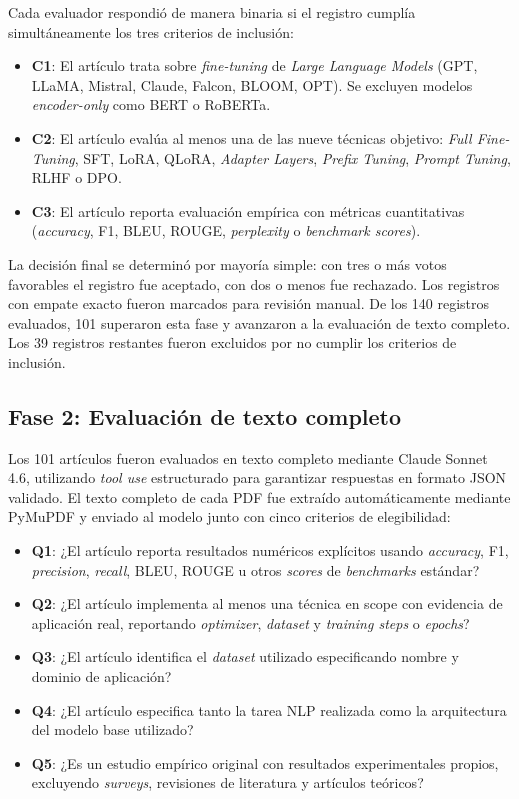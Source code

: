 Cada evaluador respondió de manera binaria si el registro cumplía simultáneamente los tres criterios de inclusión:

\begin{itemize}
    \item \textbf{C1}: El artículo trata sobre \textit{fine-tuning} de \textit{Large Language Models} (GPT, LLaMA, Mistral, Claude, Falcon, BLOOM, OPT). Se excluyen modelos \textit{encoder-only} como BERT o RoBERTa.
    \item \textbf{C2}: El artículo evalúa al menos una de las nueve técnicas objetivo: \textit{Full Fine-Tuning}, SFT, LoRA, QLoRA, \textit{Adapter Layers}, \textit{Prefix Tuning}, \textit{Prompt Tuning}, RLHF o DPO.
    \item \textbf{C3}: El artículo reporta evaluación empírica con métricas cuantitativas (\textit{accuracy}, F1, BLEU, ROUGE, \textit{perplexity} o \textit{benchmark scores}).
\end{itemize}

La decisión final se determinó por mayoría simple: con tres o más votos favorables el registro fue aceptado, con dos o menos fue rechazado. Los registros con empate exacto fueron marcados para revisión manual. De los 140 registros evaluados, 101 superaron esta fase y avanzaron a la evaluación de texto completo. Los 39 registros restantes fueron excluidos por no cumplir los criterios de inclusión.

\subsection{Fase 2: Evaluación de texto completo}

Los 101 artículos fueron evaluados en texto completo mediante Claude Sonnet 4.6, utilizando \textit{tool use} estructurado para garantizar respuestas en formato JSON validado. El texto completo de cada PDF fue extraído automáticamente mediante PyMuPDF y enviado al modelo junto con cinco criterios de elegibilidad:

\begin{itemize}
    \item \textbf{Q1}: ¿El artículo reporta resultados numéricos explícitos usando \textit{accuracy}, F1, \textit{precision}, \textit{recall}, BLEU, ROUGE u otros \textit{scores} de \textit{benchmarks} estándar?
    \item \textbf{Q2}: ¿El artículo implementa al menos una técnica en scope con evidencia de aplicación real, reportando \textit{optimizer}, \textit{dataset} y \textit{training steps} o \textit{epochs}?
    \item \textbf{Q3}: ¿El artículo identifica el \textit{dataset} utilizado especificando nombre y dominio de aplicación?
    \item \textbf{Q4}: ¿El artículo especifica tanto la tarea NLP realizada como la arquitectura del modelo base utilizado?
    \item \textbf{Q5}: ¿Es un estudio empírico original con resultados experimentales propios, excluyendo \textit{surveys}, revisiones de literatura y artículos teóricos?
\end{itemize}

